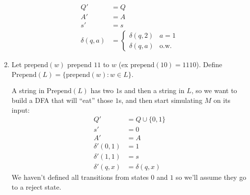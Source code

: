 \documentclass[fleqn]{article}
\begin{document}
\begin{enumerate}
\begin{answer}
\[\begin{aligned}
                Q' &= Q \\
                A' &= A \\
                s' &= s \\
                \delta(q,a) &= \begin{cases}
                    \delta(q,2) & a = 1 \\
                    \delta(q,a) & \text{o.w.}
                \end{cases}
            \end{aligned}
        \]
    \end{answer}
    \item Let $\text{prepend}(w)$ prepend $11$ to $w$ (ex $\text{prepend}(10) = 1110$). Define $\text{Prepend}(L) = \{\text{prepend}(w) : w \in L\}$.
    \begin{answer}
        A string in $\text{Prepend}(L)$ has two $1$s and then a string in $L$, so we want to build a DFA that will ``eat'' those $1$s, and then start simulating $M$ on its input:
        \[
            \begin{aligned}
                Q' &= Q \cup \{0, 1\} \\
                s' &= 0 \\
                A' &= A \\
                \delta'(0, 1) &= 1 \\
                \delta'(1, 1) &= s \\
                \delta'(q, x) &= \delta(q, x)
            \end{aligned}
        \]
        We haven't defined all transitions from states $0$ and $1$ so we'll assume they go to a reject state.


\end{answer}
\end{enumerate}
\end{document}
